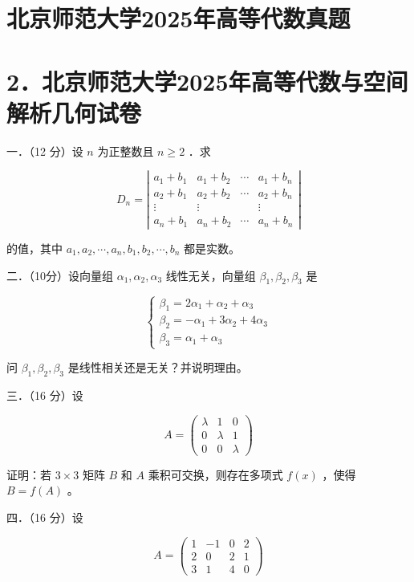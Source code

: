\documentclass{article}
\begin{document}
\section*{北京师范大学2025年高等代数真题}
\section*{2．北京师范大学2025年高等代数与空间解析几何试卷}
一．（12 分）设 \(n\) 为正整数且 \(n \geq 2\) ．求

\[
D_{n}=\left|\begin{array}{cccc}
a_{1}+b_{1} & a_{1}+b_{2} & \cdots & a_{1}+b_{n} \\
a_{2}+b_{1} & a_{2}+b_{2} & \cdots & a_{2}+b_{n} \\
\vdots & \vdots & & \vdots \\
a_{n}+b_{1} & a_{n}+b_{2} & \cdots & a_{n}+b_{n}
\end{array}\right|
\]

的值，其中 \(a_{1}, a_{2}, \cdots, a_{n}, b_{1}, b_{2}, \cdots, b_{n}\) 都是实数。

二．（10分）设向量组 \(\alpha_{1}, \alpha_{2}, \alpha_{3}\) 线性无关，向量组 \(\beta_{1}, \beta_{2}, \beta_{3}\) 是

\[
\left\{\begin{array}{l}
\beta_{1}=2 \alpha_{1}+\alpha_{2}+\alpha_{3} \\
\beta_{2}=-\alpha_{1}+3 \alpha_{2}+4 \alpha_{3} \\
\beta_{3}=\alpha_{1}+\alpha_{3}
\end{array}\right.
\]

问 \(\beta_{1}, \beta_{2}, \beta_{3}\) 是线性相关还是无关？并说明理由。

三．（16 分）设

\[
A=\left(\begin{array}{lll}
\lambda & 1 & 0 \\
0 & \lambda & 1 \\
0 & 0 & \lambda
\end{array}\right)
\]

证明：若 \(3 \times 3\) 矩阵 \(B\) 和 \(A\) 乘积可交换，则存在多项式 \(f(x)\) ，使得 \(B=f(A)\) 。

四．（16 分）设

\[
A=\left(\begin{array}{cccc}
1 & -1 & 0 & 2 \\
2 & 0 & 2 & 1 \\
3 & 1 & 4 & 0
\end{array}\right)
\]
\end{document}
